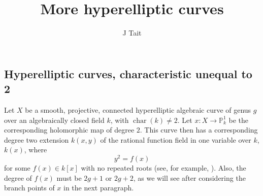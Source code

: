 \documentclass[11pt]{article} %
\title{More hyperelliptic curves}
\author{J Tait}
\theoremstyle{plain}
\theoremstyle{remark}
\DeclareMathOperator{\cha}{char}
\begin{document}
\maketitle

  \subsection{Hyperelliptic curves, characteristic unequal to 2}\label{charneq2}
  Let $X$ be a smooth, projective, connected hyperelliptic algebraic curve of genus $g$ over an algebraically closed field $k$, with $\cha (k) \neq 2$.
Let $x:X\rightarrow \mathbb{P}_k^1$ be the corresponding holomorphic map of degree $2$.
This curve then has a corresponding degree two extension $k(x,y)$ of the rational function field in one variable over $k$, $k(x)$, where
\begin{equation}\label{definingequation}
 y^2 = f(x)
\end{equation}
for some $f(x)\in k[x]$ with no repeated roots (see, for example, \cite[7.4.3]{liu}).
Also, the degree of $f(x)$ must be $2g+1$ or $2g+2$, as we will see after considering the branch points of $x$ in the next paragraph.
\end{document}
